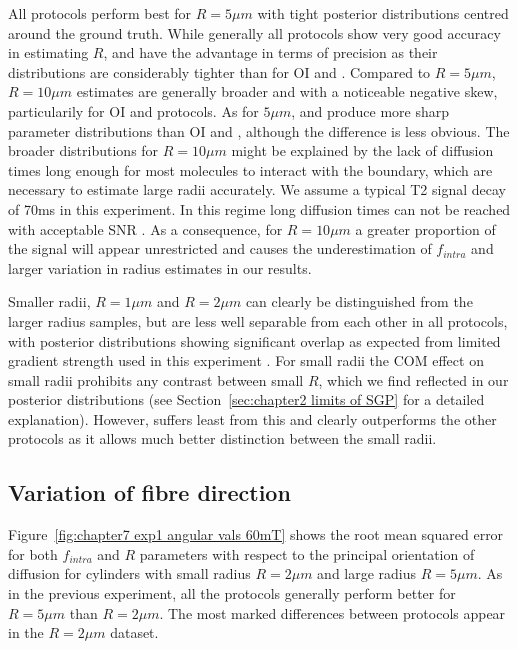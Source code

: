 All protocols perform best for $R=5\mu m$ with tight posterior distributions centred around the ground truth. While generally all protocols show very good accuracy in estimating $R$, {\DO} and {\FD} have the advantage in terms of precision as their distributions are considerably tighter than for {\gls{OI}} and {\SD}. Compared to $R=5\mu m$, $R=10\mu m$ estimates are generally broader and with a noticeable  negative skew, particularily for {\gls{OI}} and {\SD} protocols.  As for $5\mu m$, {\DO} and {\FD} produce more sharp parameter distributions than {\gls{OI}} and {\SD}, although the difference is less obvious. The broader distributions for $R=10\mu m$ might be explained by the lack of diffusion times long enough for most molecules to interact with the boundary, which are necessary to estimate large radii accurately.  We assume a typical T2 signal decay of 70ms in this experiment. In this regime long diffusion times can not be reached with acceptable \gls{SNR} \citep{Zhang:2011a}. As a consequence, for $R=10\mu m$ a greater proportion of the signal will appear unrestricted and causes the underestimation of $f_{intra}$ and larger variation in radius estimates in our results.

Smaller radii, $R=1\mu m$ and $R=2\mu m$ can clearly be distinguished from the larger radius samples, but are less well separable from each other in all protocols, with posterior distributions showing significant overlap as expected from limited gradient strength used in this experiment \citep{Alexander:2008,Alexander:2010,Siow:2012}. For small radii the \gls{COM} effect on small radii prohibits any contrast between small $R$, which we find reflected in our posterior distributions  (see Section~\ref{sec:chapter2 limits of SGP} for a detailed explanation). However, {\FD} suffers least from this and clearly outperforms the other protocols as it allows much better distinction between the small radii.


\subsection{Variation of fibre direction}
Figure~\ref{fig:chapter7 exp1 angular vals 60mT} shows the root mean squared error for both $f_{intra}$ and $R$ parameters with respect to the principal orientation of diffusion for cylinders with small radius $R=2\mu m$ and large radius $R=5\mu m$. As in the previous experiment, all the protocols generally perform better for $R=5\mu m$ than $R=2\mu m$. The most marked differences between protocols appear in the $R=2\mu m$ dataset.


